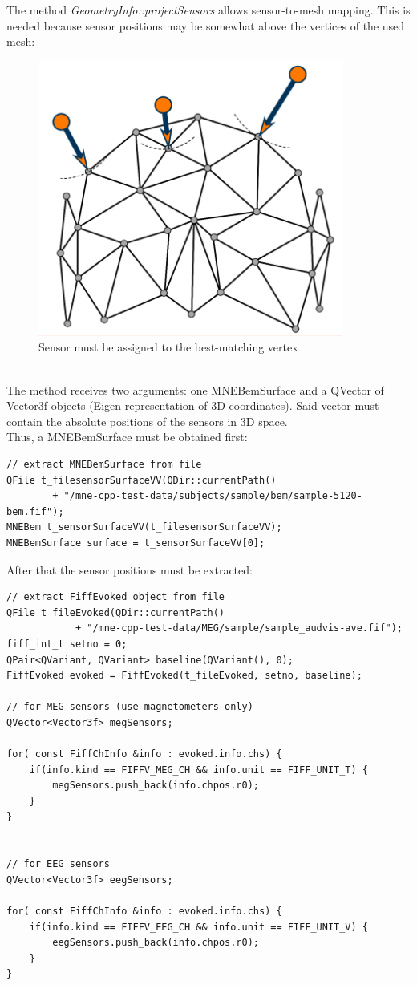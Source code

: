The method \textit{GeometryInfo::projectSensors} allows sensor-to-mesh mapping. This is needed because sensor positions may be somewhat above the vertices of the used mesh:\\
\begin{figure}[h]
	\begin{center}
		\includegraphics[width=10cm]{figures/sensorToMeshMapping.png}
		\caption{Sensor must be assigned to the best-matching vertex}
	\end{center}
\end{figure}
\\
The method receives two arguments: one MNEBemSurface and a QVector of Vector3f objects (Eigen representation of 3D coordinates). Said vector must contain the absolute positions of the sensors in 3D space.\\
Thus, a MNEBemSurface must be obtained first: 
\begin{lstlisting}
// extract MNEBemSurface from file
QFile t_filesensorSurfaceVV(QDir::currentPath()
		+ "/mne-cpp-test-data/subjects/sample/bem/sample-5120-bem.fif");
MNEBem t_sensorSurfaceVV(t_filesensorSurfaceVV);
MNEBemSurface surface = t_sensorSurfaceVV[0];
\end{lstlisting}

After that the sensor positions must be extracted:

\begin{lstlisting}
// extract FiffEvoked object from file
QFile t_fileEvoked(QDir::currentPath()
			+ "/mne-cpp-test-data/MEG/sample/sample_audvis-ave.fif");
fiff_int_t setno = 0;
QPair<QVariant, QVariant> baseline(QVariant(), 0);
FiffEvoked evoked = FiffEvoked(t_fileEvoked, setno, baseline);

// for MEG sensors (use magnetometers only)
QVector<Vector3f> megSensors;

for( const FiffChInfo &info : evoked.info.chs) {
	if(info.kind == FIFFV_MEG_CH && info.unit == FIFF_UNIT_T) {
		megSensors.push_back(info.chpos.r0);
	}
}


// for EEG sensors
QVector<Vector3f> eegSensors;
    
for( const FiffChInfo &info : evoked.info.chs) {
	if(info.kind == FIFFV_EEG_CH && info.unit == FIFF_UNIT_V) {
		eegSensors.push_back(info.chpos.r0);
	}
}
\end{lstlisting}

